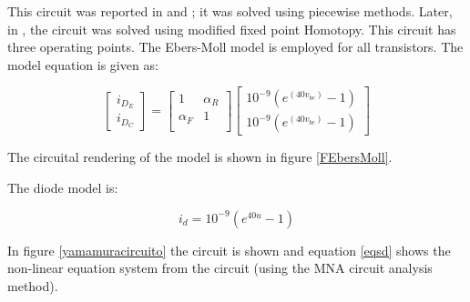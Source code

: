 \documentclass[conference,letterpaper,onecolumn]{IEEEtran}
\begin{document}
This circuit was reported in \cite{homo_tadeusiewicz} and \cite{homo_yamamurawise}; it was solved using piecewise methods. Later, in \cite{homo_yamamura}, the circuit was solved using modified fixed point Homotopy. This circuit has three operating points. The Ebers-Moll model \cite{homo_ebersmoll} is employed for all transistors. The model equation is given as:

\begin{displaymath}
\left[ \begin{array}{c}
i_{D_E} \\
i_{D_C}
\end{array}\right] =
\left[ \begin{array}{cc} 1  & \alpha_R \\
\alpha_F & 1 \\
\end{array}\right] \left[ \begin{array}{c}
10^{-9}(e^{(40v_{be})} - 1) \\
10^{-9}(e^{(40v_{bc})} - 1)
\end{array}\right]
\end{displaymath}

The circuital rendering of the model is shown in figure \ref{FEbersMoll}.

The diode model is:

\begin{displaymath}
i_d=10^{-9}(e^{40u} - 1)
\end{displaymath}

In figure \ref{yamamuracircuito} the circuit is shown and equation \ref{eqsd} shows the non-linear equation system from the circuit (using the MNA circuit analysis method).
\end{document}
